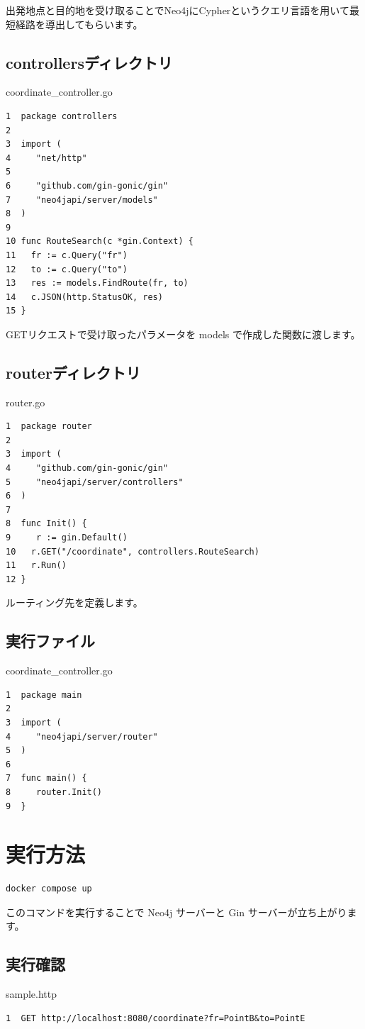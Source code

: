 出発地点と目的地を受け取ることでNeo4jにCypherというクエリ言語を用いて最短経路を導出してもらいます。
\subsection{controllersディレクトリ}
coordinate\_controller.go
\begin{tcolorbox}[breakable]
\begin{verbatim}
1  package controllers
2
3  import (
4	  "net/http"
5
6	  "github.com/gin-gonic/gin"
7	  "neo4japi/server/models"
8  )
9
10 func RouteSearch(c *gin.Context) {
11	 fr := c.Query("fr")
12	 to := c.Query("to")
13	 res := models.FindRoute(fr, to)
14	 c.JSON(http.StatusOK, res)
15 }
\end{verbatim}
\end{tcolorbox}
GETリクエストで受け取ったパラメータを models で作成した関数に渡します。
\subsection{routerディレクトリ}
router.go
\begin{tcolorbox}[breakable]
\begin{verbatim}
1  package router
2
3  import (
4	  "github.com/gin-gonic/gin"
5	  "neo4japi/server/controllers"
6  )
7
8  func Init() {
9	  r := gin.Default()
10	 r.GET("/coordinate", controllers.RouteSearch)
11	 r.Run()
12 }
\end{verbatim}
\end{tcolorbox}
ルーティング先を定義します。
\subsection{実行ファイル}
coordinate\_controller.go
\begin{tcolorbox}[breakable]
\begin{verbatim}
1  package main
2
3  import (
4	  "neo4japi/server/router"
5  )
6
7  func main() {
8	  router.Init()
9  }
\end{verbatim}
\end{tcolorbox}

\section{実行方法}
\begin{tcolorbox}[breakable]
\begin{verbatim}
docker compose up
\end{verbatim}
\end{tcolorbox}
このコマンドを実行することで Neo4j サーバーと Gin サーバーが立ち上がります。
\subsection{実行確認}
sample.http
\begin{tcolorbox}[breakable]
\begin{verbatim}
1  GET http://localhost:8080/coordinate?fr=PointB&to=PointE
\end{verbatim}
\end{tcolorbox}
